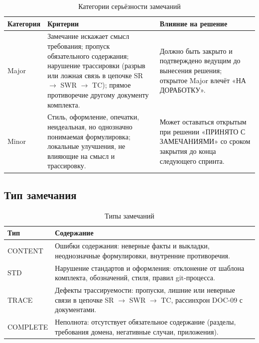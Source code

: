 \documentclass[12pt,a4paper]{article}
\begin{document}
\begin{table}[h!]
  \centering
  \caption{Категории серьёзности замечаний}
  \label{tab:severity}
  \begin{tabularx}{\textwidth}{
    >{\raggedright\arraybackslash}p{1.8cm}
    >{\raggedright\arraybackslash}X
    >{\raggedright\arraybackslash}p{4.8cm}}
    \toprule
    \textbf{Категория} & \textbf{Критерии} & \textbf{Влияние на решение} \\
    \midrule
    Major &
    Замечание искажает смысл требования; пропуск обязательного содержания;
    нарушение трассировки (разрыв или ложная связь в цепочке SR $\to$ SWR
    $\to$ TC); прямое противоречие другому документу комплекта. &
    Должно быть закрыто и подтверждено ведущим до вынесения решения; открытое
    Major влечёт «НА ДОРАБОТКУ». \\
    \addlinespace
    Minor &
    Стиль, оформление, опечатки, неидеальная, но однозначно понимаемая
    формулировка; локальные улучшения, не влияющие на смысл и трассировку. &
    Может оставаться открытым при решении «ПРИНЯТО С ЗАМЕЧАНИЯМИ» со сроком
    закрытия до конца следующего спринта. \\
    \bottomrule
  \end{tabularx}
\end{table}

\subsection{Тип замечания}

\begin{table}[h!]
  \centering
  \caption{Типы замечаний}
  \label{tab:deftype}
  \begin{tabularx}{\textwidth}{
    >{\raggedright\arraybackslash}p{2.4cm}
    >{\raggedright\arraybackslash}X}
    \toprule
    \textbf{Тип} & \textbf{Содержание} \\
    \midrule
    CONTENT & Ошибки содержания: неверные факты и выкладки, неоднозначные
    формулировки, внутренние противоречия. \\
    \addlinespace
    STD & Нарушение стандартов и оформления: отклонение от шаблона комплекта,
    обозначений, стиля, правил git-процесса. \\
    \addlinespace
    TRACE & Дефекты трассируемости: пропуски, лишние или неверные связи в
    цепочке SR $\to$ SWR $\to$ TC, рассинхрон DOC-09 с документами. \\
    \addlinespace
    COMPLETE & Неполнота: отсутствует обязательное содержание (разделы,
    требования домена, негативные случаи, приложения). \\
    \bottomrule
  \end{tabularx}
\end{table}
\end{document}
